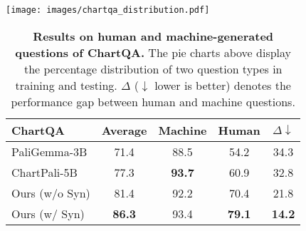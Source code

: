 \begin{table}[!t]
    \small
    \centering
    \texttt{[image: images/chartqa\_distribution.pdf]} %
    \vspace{.3cm} %
    
    \setlength{\tabcolsep}{4pt}
    \begin{tabular}{lcccc}
        \toprule
        \textbf{ChartQA} & \textbf{Average} & \textbf{Machine} & \textbf{Human} &   \textbf{$\Delta \downarrow$} \\
        \midrule
        PaliGemma-3B & 71.4 & 88.5 & 54.2 &  34.3 \\
        ChartPali-5B & 77.3 & \textbf{93.7} & 60.9 &  32.8 \\ \midrule
        Ours (w/o Syn) & 81.4 & 92.2 & 70.4 &  21.8\\
        \cellcolor{gray!10}Ours (w/ Syn) & \cellcolor{gray!10}\textbf{86.3} & \cellcolor{gray!10}93.4 & \cellcolor{gray!10}\textbf{79.1} & \cellcolor{gray!10}\textbf{14.2}\\
        \bottomrule
    \end{tabular}
    \vspace{-.1cm}
    \caption{\textbf{Results on human and machine-generated questions of ChartQA.} 
    The pie charts above display the percentage distribution of two question types in training and testing. 
    $\Delta$ ($\downarrow$ lower is better) denotes the performance gap between human and machine questions.}
    \label{tab:chartqa}
    \vspace{-.3cm}
\end{table}